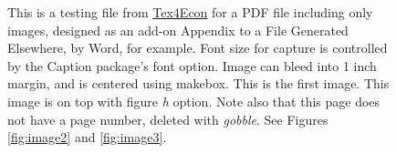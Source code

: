 \documentclass{article}
\begin{document}

\begin{figure}[h]
\hspace*{-\dimexpr\oddsidemargin+1in\relax}
\caption{This is a testing file from \href{https://fanwangecon.github.io/Tex4Econ/}{Tex4Econ} for a PDF file including only images, designed as an add-on Appendix to a File Generated Elsewhere, by Word, for example. Font size for capture is controlled by the Caption package's font option. Image can bleed into 1 inch margin, and is centered using makebox. This is the first image. This image is on top with figure \textit{h} option. Note also that this page does not have a page number, deleted with \textit{gobble}. See Figures \ref{fig:image2} and \ref{fig:image3}. \label{fig:image1}}
\hspace*{-\paperwidth}
\end{figure}

\pagebreak
\clearpage

\setcounter{page}{26}
\end{document}
